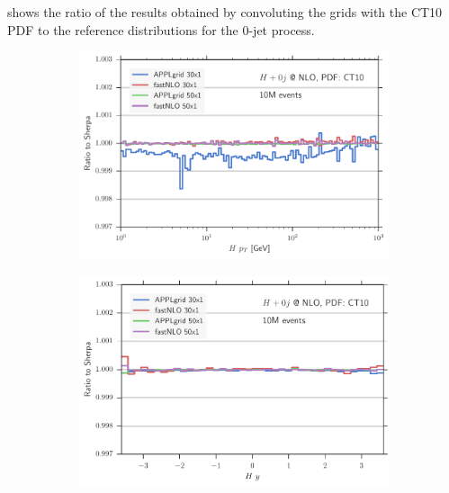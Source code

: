 shows the ratio of the results obtained by convoluting the grids with the CT10 PDF to the reference distributions for the 0-jet process.%
%
\begin{figure}
\centering
\begin{subfigure}[]{0.49\textwidth}
	\includegraphics[width=\textwidth]{images/hnlo_hpt_50v30.pdf}
\end{subfigure}
\hfill
\begin{subfigure}[]{0.49\textwidth}
	\includegraphics[width=\textwidth]{images/hnlo_hy_50v30.pdf}
\end{subfigure}


\end{figure}

